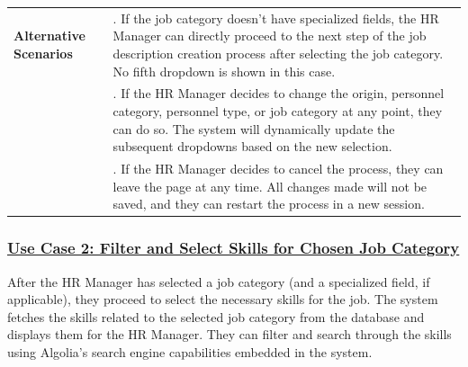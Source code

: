 \begin{table}[H]
\begin{tabularx}{1.2\textwidth} {
            | >{\hsize=0.4\hsize\raggedright\arraybackslash}X
            | >{\hsize=1.6\hsize\raggedright\arraybackslash}X |}
        \textbf{Alternative Scenarios} & 1. If the job category doesn't have specialized fields, the HR Manager can directly proceed to the next step of the job description creation process after selecting the job category. No fifth dropdown is shown in this case. \\
        & 2. If the HR Manager decides to change the origin, personnel category, personnel type, or job category at any point, they can do so. The system will dynamically update the subsequent dropdowns based on the new selection. \\
        & 3. If the HR Manager decides to cancel the process, they can leave the page at any time. All changes made will not be saved, and they can restart the process in a new session. \\
        \hline
    \end{tabularx}
    \normalsize
\end{table}

\subsubsection{\underline{Use Case 2: Filter and Select Skills for Chosen Job Category }}
After the HR Manager has selected a job category (and a specialized field, if applicable), they proceed to select the necessary skills for the job. The system fetches the skills related to the selected job category from the database and displays them for the HR Manager. They can filter and search through the skills using Algolia's search engine capabilities embedded in the system.

\vspace{1cm}

